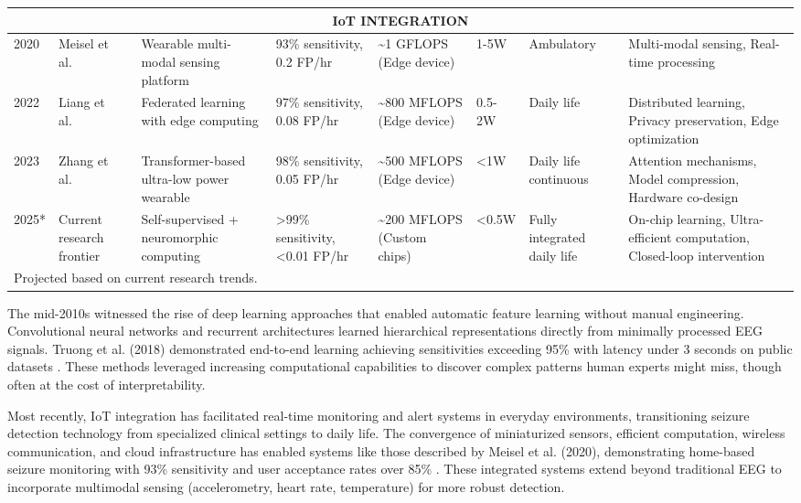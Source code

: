 \documentclass[pdflatex,sn-mathphys-num]{sn-jnl}%
\theoremstyle{thmstyleone}%
\theoremstyle{thmstyletwo}%
\theoremstyle{thmstylethree}%
\begin{document}
\begin{landscape}
\begin{longtable}{|p{1.2cm}|p{1.5cm}|p{2.5cm}|p{2.3cm}|p{2.5cm}|p{1.8cm}|p{2.2cm}|p{3cm}|}
\multicolumn{8}{|c|}{\textbf{IoT INTEGRATION}} \\
\hline
2020 & Meisel et al.~\cite{meisel2020} & Wearable multi-modal sensing platform & 93\% sensitivity, 0.2 FP/hr & \textasciitilde1 GFLOPS (Edge device) & 1-5W & Ambulatory & Multi-modal sensing, Real-time processing \\
\hline
2022 & Liang et al.~\cite{liang2022} & Federated learning with edge computing & 97\% sensitivity, 0.08 FP/hr & \textasciitilde800 MFLOPS (Edge device) & 0.5-2W & Daily life & Distributed learning, Privacy preservation, Edge optimization \\
\hline
2023 & Zhang et al.~\cite{zhang2023} & Transformer-based ultra-low power wearable & 98\% sensitivity, 0.05 FP/hr & \textasciitilde500 MFLOPS (Edge device) & <1W & Daily life continuous & Attention mechanisms, Model compression, Hardware co-design \\
\hline
2025* & Current research frontier & Self-supervised + neuromorphic computing & >99\% sensitivity, <0.01 FP/hr & \textasciitilde200 MFLOPS (Custom chips) & <0.5W & Fully integrated daily life & On-chip learning, Ultra-efficient computation, Closed-loop intervention \\
\hline
\multicolumn{8}{l}{\footnotesize *Projected based on current research trends.} \\
\end{longtable}
\end{landscape}


The mid-2010s witnessed the rise of deep learning approaches that enabled automatic feature learning without manual engineering. Convolutional neural networks and recurrent architectures learned hierarchical representations directly from minimally processed EEG signals. Truong et al. (2018) demonstrated end-to-end learning achieving sensitivities exceeding 95\% with latency under 3 seconds on public datasets \citep{Truong2018}. These methods leveraged increasing computational capabilities to discover complex patterns human experts might miss, though often at the cost of interpretability.

Most recently, IoT integration has facilitated real-time monitoring and alert systems in everyday environments, transitioning seizure detection technology from specialized clinical settings to daily life. The convergence of miniaturized sensors, efficient computation, wireless communication, and cloud infrastructure has enabled systems like those described by Meisel et al. (2020), demonstrating home-based seizure monitoring with 93\% sensitivity and user acceptance rates over 85\% \citep{Meisel2020}. These integrated systems extend beyond traditional EEG to incorporate multimodal sensing (accelerometry, heart rate, temperature) for more robust detection.
\end{document}
